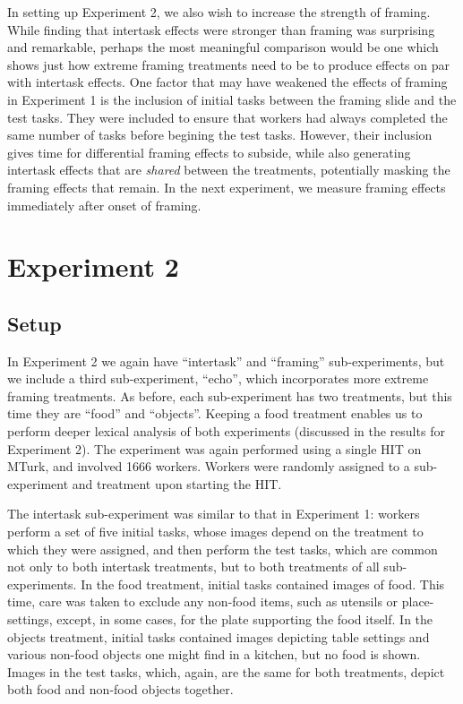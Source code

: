 \documentclass{sigchi}
\begin{document}
In setting up Experiment 2, we also wish to increase the strength of 
framing.  While finding that intertask effects were stronger than framing 
was surprising and remarkable, perhaps the most meaningful comparison
would be one which shows just how extreme framing treatments need to be 
to produce effects on par with intertask effects.  
One factor that may have weakened the effects of framing in Experiment 1 
is the inclusion of initial tasks between the framing slide and the test 
tasks. They were included to ensure that workers had always completed the
same number of tasks before begining the test tasks.  However, their 
inclusion gives time for differential framing effects to 
subside, while also generating intertask effects that are 
\textit{shared} between the treatments, potentially masking the framing 
effects that remain.  In the next experiment, we measure framing effects 
immediately after onset of framing.

\section{Experiment 2}
\subsection{Setup}
In Experiment 2 we again have ``intertask'' and ``framing'' 
sub-experiments, but we include a third sub-experiment, ``echo'', which 
incorporates more extreme framing treatments.  
As before, each sub-experiment has
two treatments, but this time they are ``food'' and ``objects''.
Keeping a food treatment enables us to perform deeper lexical analysis of 
both experiments (discussed in the results for Experiment 2).  
The experiment was again performed using a single HIT on MTurk, 
and involved 1666 workers.
Workers were randomly assigned to a sub-experiment and treatment upon
starting the HIT.

The intertask sub-experiment was similar to that in Experiment 1: workers
perform a set of five initial tasks, whose images depend on the treatment
to which they were assigned, and then perform the test tasks, which are
common not only to both intertask treatments, but to both treatments of 
all sub-experiments.  In the food treatment, initial tasks contained
images of food.  This time, care was taken to exclude any non-food items, 
such as utensils or place-settings, except, in some cases, for the plate
supporting the food itself.  In the objects treatment, initial tasks 
contained images depicting table settings and various non-food objects one 
might find in a kitchen, but no food is shown.  Images in the test tasks,
which, again, are the same for both treatments,
depict both food and non-food objects together.
\end{document}
